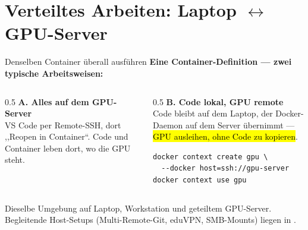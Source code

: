 \documentclass[aspectratio=169,11pt]{beamer}
\begin{document}
\section{Verteiltes Arbeiten: Laptop \texorpdfstring{$\leftrightarrow$}{<->} GPU-Server}
\begin{frame}[fragile]{Denselben Container überall ausführen}
  \textbf{Eine Container-Definition --- zwei typische Arbeitsweisen:}
  \vspace{0.4em}
  \begin{columns}[T]
    \begin{column}{0.5\textwidth}
      \textbf{A. Alles auf dem GPU-Server}\\[2pt]
      VS Code per Remote-SSH, dort ,,Reopen in Container``.
      Code und Container leben dort, wo die GPU steht.
    \end{column}
    \begin{column}{0.5\textwidth}
      \textbf{B. Code lokal, GPU remote}\\[2pt]
      Code bleibt auf dem Laptop, der Docker-Daemon auf dem Server
      übernimmt --- \hl{GPU ausleihen, ohne Code zu kopieren}.
\begin{lstlisting}[language=myshell]
docker context create gpu \
  --docker host=ssh://gpu-server
docker context use gpu
\end{lstlisting}
    \end{column}
  \end{columns}
  \vspace{0.2em}
  \begin{takeaway}[Kerngedanke]
    Dieselbe Umgebung auf Laptop, Workstation und geteiltem GPU-Server.
    Begleitende Host-Setups (Multi-Remote-Git, eduVPN, SMB-Mounts)
    liegen in \code{docs/help/NewPC/}.
  \end{takeaway}
\end{frame}

\end{document}
